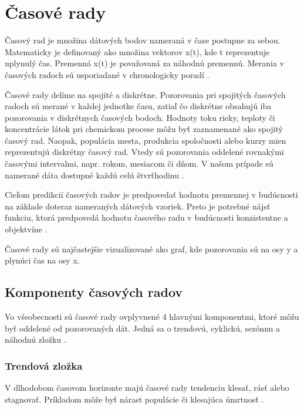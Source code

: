 \documentclass[12pt,oneside,slovak,a4paper]{book}
\begin{document}

\chapter{Časové rady}
Časový rad je množina dátových bodov nameraná v čase postupne za sebou.
Matematicky je definovaný ako množina vektorov x(t), kde t reprezentuje
uplynulý čas. Premenná x(t) je považovaná za náhodnú premennú.
Merania v časových radoch sú usporiadané v chronologicky
poradí \cite{Agrawal2013}.

Časové rady delíme na spojité a diskrétne. Pozorovania pri spojitých časových
radoch sú merané v každej jednotke času, zatiaľ čo diskrétne obsahujú iba
pozorovania v diskrétnych časových bodoch. Hodnoty toku rieky, teploty
či koncentrácie látok pri chemickom procese môžu byť zaznamenané ako spojitý
časový rad. Naopak, populácia mesta, produkcia spoločnosti alebo kurzy mien
reprezentujú diskrétny časový rad. Vtedy sú pozorovania oddelené rovnakými
časovými intervalmi, napr. rokom, mesiacom či dňom. V našom prípade sú namerané
dáta dostupné každú celú štvrťhodinu \cite{Agrawal2013}.

Cieľom predikcií časových radov je predpovedať hodnotu premennej v budúcnosti
na základe doteraz nameraných dátových vzoriek. Preto je potrebné nájsť funkciu,
ktorá predpovedá hodnotu časového radu v budúcnosti konzistentne
a objektvíne \cite{Sapankevych2009}.

Časové rady sú najčastejšie vizualizované ako graf, kde pozorovania sú na
osy y a plynúci čas na osy x.

\section{Komponenty časových radov}
Vo všeobecnosti sú časové rady ovplyvnené 4 hlavnými komponentmi, ktoré môžu
byť oddelené od pozorovaných dát. Jedná sa o trendovú, cyklickú, sezónnu
a náhodnú zložku \cite{Agrawal2013}.

\subsection{Trendová zložka}
V dlhodobom časovom horizonte majú časové rady tendenciu klesať, rásť alebo
stagnovať. Príkladom môže byť nárast populácie či klesajúca
úmrtnosť \cite{Agrawal2013}.
\end{document}
